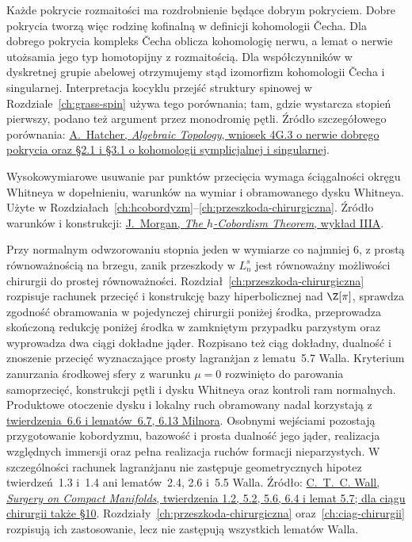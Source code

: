 \begin{description}[leftmargin=2.9cm,style=nextline]
\item[Kohomologia Čech i singularna.]
  Każde pokrycie rozmaitości ma
  rozdrobnienie będące dobrym pokryciem.
  Dobre pokrycia tworzą więc rodzinę
  kofinalną w definicji kohomologii
  Čecha. Dla dobrego pokrycia kompleks
  Čecha oblicza kohomologię nerwu,
  a lemat o nerwie utożsamia jego
  typ homotopijny z rozmaitością.
  Dla współczynników w dyskretnej
  grupie abelowej otrzymujemy stąd
  izomorfizm kohomologii Čecha
  i singularnej. Interpretacja
  kocyklu przejść struktury
  spinowej w Rozdziale~\ref{ch:grass-spin}
  używa tego porównania;
  tam, gdzie wystarcza stopień
  pierwszy, podano też argument
  przez monodromię pętli.
  Źródło szczegółowego porównania:
  \href{https://pi.math.cornell.edu/~hatcher/AT/AT.pdf}
  {A.\ Hatcher, \emph{Algebraic Topology},
  wniosek 4G.3 o nerwie dobrego pokrycia
  oraz §2.1 i §3.1 o kohomologii
  symplicjalnej i singularnej}.

\item[Trik Whitneya i ruchy uchwytów.]
  Wysokowymiarowe usuwanie par
  punktów przecięcia wymaga
  ściągalności okręgu Whitneya
  w dopełnieniu, warunków na wymiar
  i obramowanego dysku Whitneya.
  Użyte w
  Rozdziałach~\ref{ch:hcobordyzm}--\ref{ch:przeszkoda-chirurgiczna}.
  Źródło warunków i konstrukcji:
  \href{https://www.math.columbia.edu/~jmorgan/Lecture_IIIA_hcobordism_Contd.pdf}
  {J.\ Morgan, \emph{The $h$-Cobordism Theorem},
  wykład IIIA}.

\item[Twierdzenia Walla.]
  Przy normalnym odwzorowaniu
  stopnia jeden w wymiarze
  co najmniej $6$, z prostą
  równoważnością na brzegu,
  zanik przeszkody w $L_n^s$
  jest równoważny możliwości
  chirurgii do prostej
  równoważności. Rozdział~\ref{ch:przeszkoda-chirurgiczna}
  rozpisuje rachunek przecięć i konstrukcję
  bazy hiperbolicznej nad $\Z[\pi]$,
  sprawdza zgodność obramowania w pojedynczej
  chirurgii poniżej środka, przeprowadza
  skończoną redukcję poniżej środka w zamkniętym
  przypadku parzystym oraz wyprowadza dwa
  ciągi dokładne jąder.
  Rozpisano też ciąg dokładny, dualność
  i znoszenie przecięć wyznaczające prosty
  lagranżjan z lematu~5.7 Walla. Kryterium
  zanurzania środkowej sfery z warunku
  $\mu=0$ rozwinięto do parowania samoprzecięć,
  konstrukcji pętli i dysku Whitneya oraz
  kontroli ram normalnych. Produktowe
  otoczenie dysku i lokalny ruch obramowany
  nadal korzystają z
  \href{https://webhomes.maths.ed.ac.uk/~v1ranick/surgery/hcobord.pdf}
  {twierdzenia~6.6 i lematów~6.7, 6.13 Milnora}.
  Osobnymi wejściami pozostają przygotowanie kobordyzmu,
  bazowość i prosta dualność jego jąder,
  realizacja względnych immersji oraz
  pełna realizacja ruchów formacji
  nieparzystych. W szczególności rachunek
  lagranżjanu nie zastępuje geometrycznych
  hipotez twierdzeń~1.3 i~1.4 ani
  lematów~2.4, 2.6 i~5.5 Walla.
  Źródło:
  \href{https://webhomes.maths.ed.ac.uk/~v1ranick/books/scm.pdf}
  {C.~T.~C. Wall, \emph{Surgery on Compact
  Manifolds}, twierdzenia 1.2, 5.2,
  5.6, 6.4 i lemat 5.7; dla ciągu
  chirurgii także §10}.
  Rozdziały~\ref{ch:przeszkoda-chirurgiczna}
  oraz~\ref{ch:ciag-chirurgii}
  rozpisują ich zastosowanie,
  lecz nie zastępują wszystkich
  lematów Walla.


\end{description}
